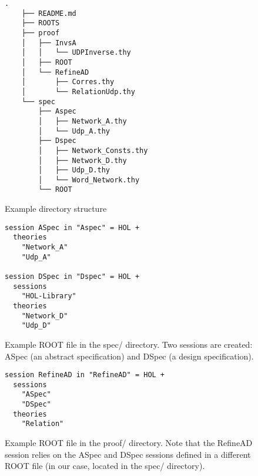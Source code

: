 \documentclass[twoside]{memoir}
\begin{document}
\begin{figure}[htpb]
    \centering
    \begin{lstlisting}[style=tree, language=file]
    .
    ├── README.md
    ├── ROOTS
    ├── proof
    │   ├── InvsA
    │   │   └── UDPInverse.thy
    │   ├── ROOT
    │   └── RefineAD
    │       ├── Corres.thy
    │       └── RelationUdp.thy
    └── spec
        ├── Aspec
        │   ├── Network_A.thy
        │   └── Udp_A.thy
        ├── Dspec
        │   ├── Network_Consts.thy
        │   ├── Network_D.thy
        │   ├── Udp_D.thy
        │   └── Word_Network.thy
        └── ROOT
    \end{lstlisting}
    
    \caption{Example directory structure}
    \label{fig:isabelle-roots-file}
\end{figure}

\begin{figure}[htpb]
    \centering
    \begin{lstlisting}[language=isabelle]
session ASpec in "Aspec" = HOL +
  theories
    "Network_A"
    "Udp_A"

session DSpec in "Dspec" = HOL +
  sessions
    "HOL-Library"
  theories
    "Network_D"
    "Udp_D"
    \end{lstlisting}
    
    \caption{Example ROOT file in the spec/ directory. Two sessions are created: ASpec (an abstract specification) and DSpec (a design specification).}
    \label{fig:isabelle-root-file-spec}
\end{figure}

\begin{figure}[htpb]
    \centering
    \begin{lstlisting}[language=isabelle]
session RefineAD in "RefineAD" = HOL +
  sessions
    "ASpec"
    "DSpec"
  theories
    "Relation"
    \end{lstlisting}
    
    \caption{Example ROOT file in the proof/ directory. Note that the RefineAD session relies on the ASpec and DSpec sessions defined in a different ROOT file (in our case, located in the spec/ directory).}
    \label{fig:isabelle-root-file-proof}
\end{figure}

\backmatter

\end{document}
